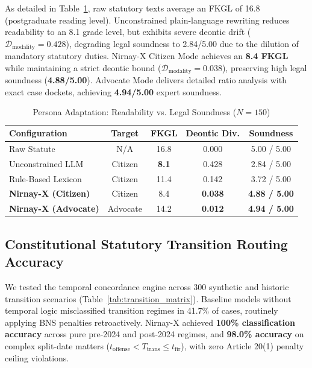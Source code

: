 \documentclass[conference]{IEEEtran}
\begin{document}
As detailed in Table~\ref{tab:persona}, raw statutory texts average an FKGL of 16.8 (postgraduate reading level). Unconstrained plain-language rewriting reduces readability to an 8.1 grade level, but exhibits severe deontic drift ($\mathcal{D}_{\text{modality}} = 0.428$), degrading legal soundness to 2.84/5.00 due to the dilution of mandatory statutory duties. Nirnay-X Citizen Mode achieves an \textbf{8.4 FKGL} while maintaining a strict deontic bound ($\mathcal{D}_{\text{modality}} = 0.038$), preserving high legal soundness (\textbf{4.88/5.00}). Advocate Mode delivers detailed ratio analysis with exact case dockets, achieving \textbf{4.94/5.00} expert soundness.

\begin{table}[!t]
\caption{Persona Adaptation: Readability vs. Legal Soundness ($N=150$)}
\label{tab:persona}
\centering
\footnotesize
\setlength{\tabcolsep}{2.5pt}
\begin{tabularx}{\columnwidth}{>{\raggedright\arraybackslash}Xcccc}
\toprule
\textbf{Configuration} & \textbf{Target} & \textbf{FKGL} & \textbf{Deontic Div.} & \textbf{Soundness} \\
\midrule
Raw Statute & N/A & 16.8 & 0.000 & 5.00 / 5.00 \\
Unconstrained LLM & Citizen & \textbf{8.1} & 0.428 & 2.84 / 5.00 \\
Rule-Based Lexicon & Citizen & 11.4 & 0.142 & 3.72 / 5.00 \\
\midrule
\textbf{Nirnay-X (Citizen)} & Citizen & 8.4 & \textbf{0.038} & \textbf{4.88 / 5.00} \\
\textbf{Nirnay-X (Advocate)} & Advocate & 14.2 & \textbf{0.012} & \textbf{4.94 / 5.00} \\
\bottomrule
\end{tabularx}
\end{table}

\subsection{Constitutional Statutory Transition Routing Accuracy}
We tested the temporal concordance engine across 300 synthetic and historic transition scenarios (Table~\ref{tab:transition_matrix}). Baseline models without temporal logic misclassified transition regimes in 41.7\% of cases, routinely applying BNS penalties retroactively. Nirnay-X achieved \textbf{100\% classification accuracy} across pure pre-2024 and post-2024 regimes, and \textbf{98.0\% accuracy} on complex split-date matters ($t_{\text{offense}} < T_{\text{trans}} \le t_{\text{fir}}$), with zero Article 20(1) penalty ceiling violations.
\end{document}
